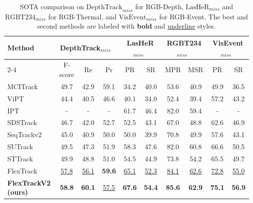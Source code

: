 \begin{table}[t]
\caption{SOTA comparison on $\mathrm{DepthTrack}_{miss}$ \cite{depthtrack} for RGB-Depth, $\mathrm{LasHeR}_{miss}$\cite{li2021lasher} and $\mathrm{RGBT234}_{miss}$\cite{rgbt234} for RGB-Thermal, and $\mathrm{VisEvent}_{miss}$\cite{wang2023visevent} for RGB-Event. The best and second methods are labeled with \textbf{bold} and \underline{underline} styles.}
\label{tab-sota-miss}
\centering
\setlength{\tabcolsep}{3mm} %
\small %
\begin{tabular}{l|ccc|cc|cc|cc}
\toprule
\multirow{2}{*}{Method} 
& \multicolumn{3}{c|}{DepthTrack$_{miss}$~\cite{depthtrack}} 
& \multicolumn{2}{c|}{LasHeR$_{miss}$~\cite{li2021lasher}} 
& \multicolumn{2}{c|}{RGBT234$_{miss}$~\cite{rgbt234}} 
& \multicolumn{2}{c}{VisEvent$_{miss}$~\cite{wang2023visevent}} \\
\cline{2-4} \cline{5-6} \cline{7-8} \cline{9-10}
& F-score & Re & Pr 
& PR & SR 
& MPR & MSR 
& PR & SR \\
\midrule

MCITrack~\cite{mcitrack} 
& 49.7 & 42.9 & 59.1 & 34.2 & 40.0 & 53.6 & 40.9 & 49.9 & 36.5 \\
ViPT~\cite{vipt} 
& 44.4 & 40.5 & 46.6 & 40.1 & 34.0 & 52.4 & 39.4 & 57.2 & 43.2 \\
IPT~\cite{ipt} 
& - & - & - & 61.7 & 46.4 & 82.0 & 59.4 & - & - \\
SDSTrack~\cite{hou2024sdstrack} 
& 46.7 & 42.0 & 52.7 & 52.5 & 43.1 & 67.0 & 48.8 & 62.6 & 46.9 \\
SeqTrackv2~\cite{seqtrack} 
& 45.0 & 40.9 & 50.0 & 50.0 & 39.9 & 70.8 & 49.9 & 57.6 & 43.1 \\
SUTrack~\cite{chen2024sutrack} 
& 49.5 & 47.3 & 51.9 & 58.3 & 47.6 & 82.0 & 60.8 & 66.6 & 50.5 \\
STTrack \cite{sttrack} 
& 49.9 & {48.8} & 51.0 & 54.5 & 44.9 & 73.8 & 54.2 & 65.5 & 49.7 \\
FlexTrack & \underline{57.8} & \underline{56.1} & \textbf{59.6} & \underline{65.1} & \underline{52.3} & \underline{84.1} & \underline{62.6} & \underline{72.8} & \underline{55.0} \\

\midrule

\textbf{FlexTrackV2 (ours)}
& \textbf{58.8} & \textbf{60.1} & \underline{57.5} & \textbf{67.6} & \textbf{54.4} & \textbf{85.6} & \textbf{62.9} & \textbf{75.1} & \textbf{56.9}\\

\bottomrule
\end{tabular}
\end{table}


